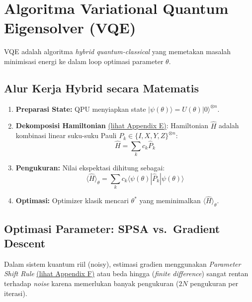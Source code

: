 \hypertarget{algoritma-variational-quantum-eigensolver-vqe}{%
\section{Algoritma Variational Quantum Eigensolver (VQE)}\label{algoritma-variational-quantum-eigensolver-vqe}}

VQE adalah algoritma \emph{hybrid quantum-classical} yang memetakan masalah minimisasi energi ke dalam loop optimasi parameter \(\theta\).

\hypertarget{a.-alur-kerja-hybrid-secara-matematis}{%
\subsection{Alur Kerja Hybrid secara Matematis}\label{a.-alur-kerja-hybrid-secara-matematis}}

\begin{enumerate}
\def\labelenumi{\arabic{enumi}.}
\tightlist
\item
  \textbf{Preparasi State:} QPU menyiapkan state \(|\psi(\theta)\rangle = U(\theta)|0\rangle^{\otimes n}\).
\item
  \textbf{Dekomposisi Hamiltonian} \hyperref[appendix-e]{(lihat Appendix E)}: Hamiltonian \(\hat{H}\) adalah kombinasi linear suku-suku Pauli \(P_k \in \{I, X, Y, Z\}^{\otimes n}\): \[ \hat{H} = \sum_k c_k \hat{P}_k \]
\item
  \textbf{Pengukuran:} Nilai ekspektasi dihitung sebagai: \[ \langle \hat{H} \rangle_{\theta} = \sum_k c_k \langle \psi(\theta) | \hat{P}_k | \psi(\theta) \rangle \]
\item
  \textbf{Optimasi:} Optimizer klasik mencari \(\theta^*\) yang meminimalkan \(\langle \hat{H} \rangle_{\theta}\).
\end{enumerate}

\hypertarget{b.-optimasi-parameter-spsa-vs.-gradient-descent}{%
\subsection{Optimasi Parameter: SPSA vs.~Gradient Descent}\label{b.-optimasi-parameter-spsa-vs.-gradient-descent}}

Dalam sistem kuantum riil (noisy), estimasi gradien menggunakan \textit{Parameter Shift Rule} \hyperref[appendix-f]{(lihat Appendix F)} atau beda hingga (\textit{finite difference}) sangat rentan terhadap \emph{noise} karena memerlukan banyak pengukuran (\(2N\) pengukuran per iterasi).

